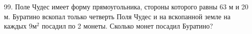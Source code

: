 99. Поле Чудес имеет форму прямоугольника, стороны которого равны 63 м и 20 м. Буратино вскопал только четверть Поля Чудес и на вскопанной земле на каждых
$9\text{м}^2$ посадил по 2 монеты. Сколько монет посадил Буратино?\\
